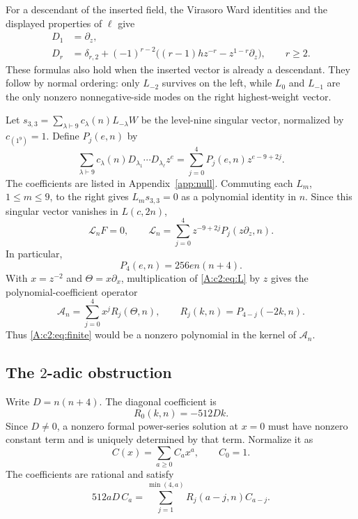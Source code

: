 \documentclass[11pt]{article}
\numberwithin{equation}{section}
\begin{document}
For a descendant of the inserted field, the Virasoro Ward identities and the displayed properties of $\ell$ give
\begin{align*}
 D_1&=\partial_z,\\
 D_r&=\delta_{r,2}+(-1)^{r-2}
       \big((r-1)h z^{-r}-z^{1-r}\partial_z\big),\qquad r\geq2.
\end{align*}
These formulas also hold when the inserted vector is already a descendant. They follow by normal ordering: only $L_{-2}$ survives on the left, while $L_0$ and $L_{-1}$ are the only nonzero nonnegative-side modes on the right highest-weight vector.

Let $s_{3,3}=\sum_{\lambda\vdash9}c_\lambda(n)L_{-\lambda}W$ be the level-nine singular vector, normalized by $c_{(1^9)}=1$. Define $P_j(e,n)$ by
\begin{equation}\label{A:c2:eq:defP}
 \sum_{\lambda\vdash9}c_\lambda(n)
 D_{\lambda_1}\cdots D_{\lambda_\ell}z^e
   =\sum_{j=0}^4P_j(e,n)z^{e-9+2j}.
\end{equation}
The coefficients are listed in Appendix~\ref{app:null}. Commuting each $L_m$, $1\leq m\leq9$, to the right gives $L_m s_{3,3}=0$ as a polynomial identity in $n$. Since this singular vector vanishes in $L(c,2n)$,
\begin{equation}\label{A:c2:eq:L}
 \mathcal L_n F=0,\qquad
 \mathcal L_n=\sum_{j=0}^4z^{-9+2j}P_j(z\partial_z,n).
\end{equation}
In particular,
\[
 P_4(e,n)=256en(n+4).
\]
With $x=z^{-2}$ and $\Theta=x\partial_x$, multiplication of \eqref{A:c2:eq:L} by $z$ gives the polynomial-coefficient operator
\begin{equation}\label{A:c2:eq:A}
 \mathcal A_n=\sum_{j=0}^4x^jR_j(\Theta,n),\qquad
 R_j(k,n)=P_{4-j}(-2k,n).
\end{equation}
Thus \eqref{A:c2:eq:finite} would be a nonzero polynomial in the kernel of $\mathcal A_n$.

\subsection{The $2$-adic obstruction}
Write $D=n(n+4)$. The diagonal coefficient is
\[
 R_0(k,n)=-512Dk.
\]
Since $D\ne0$, a nonzero formal power-series solution at $x=0$ must have nonzero constant term and is uniquely determined by that term. Normalize it as
\[
 C(x)=\sum_{a\geq0}C_a x^a,\qquad C_0=1.
\]
The coefficients are rational and satisfy
\begin{equation}\label{A:c2:eq:rec}
 512aD\, C_a=\sum_{j=1}^{\min(4,a)}R_j(a-j,n)C_{a-j}.
\end{equation}
\end{document}
